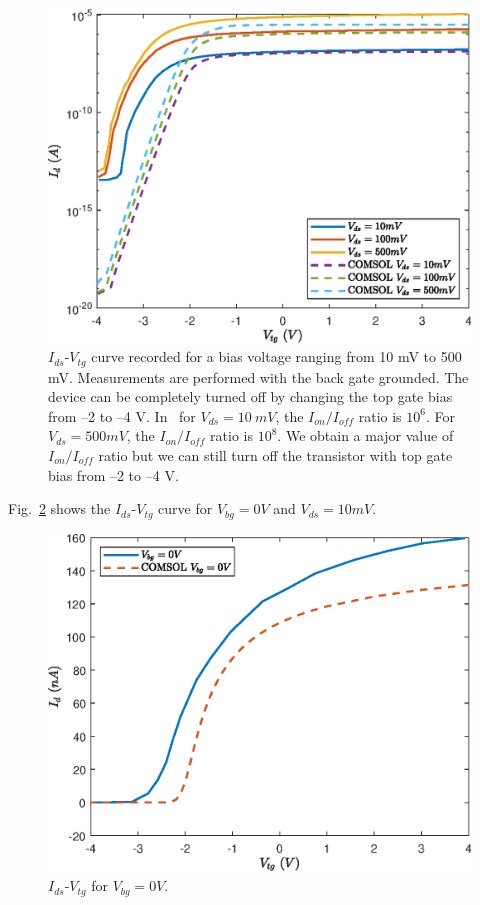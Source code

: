 \documentclass[12pt,a4paper,titlepage]{article}
\begin{document}
\begin{figure}[H]
	\centering
	\includegraphics[width=.8\textwidth]{Grafici/Id(Vtg)_HfO2_MoS2_varying_Vds.eps} 
	\caption{$I_{ds}$-$V_{tg}$ curve recorded for a bias voltage ranging from 10 mV to 500 mV. Measurements are performed with the back gate grounded. The device can be completely turned off by changing the top gate bias from –2 to –4 V. In~\cite{Radisavljevic:Si_MoS2} for $V_{ds} = 10~mV$, the $I_{on}/I_{off}$ ratio is $10^6$. For $V_{ds} = 500 mV$, the $I_{on}/I_{off}$ ratio is $10^8$. We obtain a major value of $I_{on}/I_{off}$ ratio but we can still turn off the transistor with top gate bias from –2 to –4 V.}
	\label{fig:Id(Vtg)_HfO2_MoS2_varying_Vds}
\end{figure}

Fig.~\ref{fig:Id(Vtg)_HfO2_MoS2_varying_Vbg} shows the $I_{ds}$-$V_{tg}$ curve for $V_{bg}=0V$ and $V_{ds}=10mV$.

\begin{figure}[H]
	\centering
	\includegraphics[width=.7\textwidth]{Grafici/Id(Vtg)_HfO2_MoS2_varying_Vbg.eps} 
	\caption{$I_{ds}$-$V_{tg}$ for $V_{bg}=0V$.}
	\label{fig:Id(Vtg)_HfO2_MoS2_varying_Vbg}
\end{figure}
\end{document}
